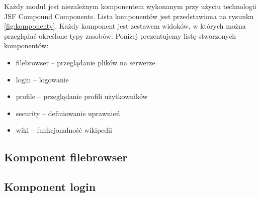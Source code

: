 \documentclass{classrep}
\begin{document}
Każdy moduł jest niezależnym komponentem wykonanym przy użyciu technologii JSF Compound Components.
Lista komponentów jest przedstawiona na rysunku \ref{fig:komponenty}.
Każdy komponent jest zestawem widoków, w których można przeglądać określone typy zasobów.
Poniżej prezentujemy listę stworzonych komponentów:
\begin{itemize}
  \item filebrowser -- przeglądanie plików na serwerze
  \item login -- logowanie
  \item profile -- przeglądanie profili użytkowników
  \item security -- definiowanie uprawnień
  \item wiki -- funkcjonalność wikipedii
\end{itemize}

\subsection{Komponent filebrowser}
\subsection{Komponent login}
\end{document}
